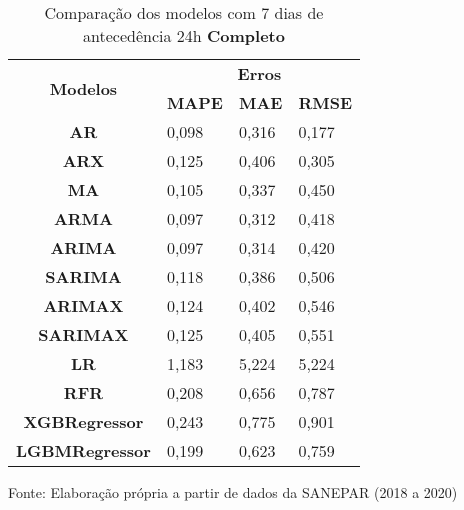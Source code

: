 \begin{table}[H]
	\centering
	\caption{Comparação dos modelos com 7 dias de antecedência 24h \textbf{Completo} }\label{tb:10-24cm}
	\begin{tabular}{@{}clll@{}}
		\toprule
		\multirow{2}{*}{\textbf{Modelos}} & \multicolumn{3}{c}{\textbf{Erros}}                                                                       \\ \cmidrule(l){2-4} 
		& \multicolumn{1}{c}{\textbf{MAPE}} & \multicolumn{1}{c}{\textbf{MAE}} & \multicolumn{1}{c}{\textbf{RMSE}} \\ \hline
\textbf{AR}                       & 0,098                             & 0,316                            & 0,177                             \\
\textbf{ARX}                      & 0,125                             & 0,406                            & 0,305                             \\
\textbf{MA}                       & 0,105                             & 0,337                            & 0,450                             \\
\textbf{ARMA}                     & 0,097                             & 0,312                            & 0,418                             \\
\textbf{ARIMA}                    & 0,097                             & 0,314                            & 0,420                             \\
\textbf{SARIMA}                   & 0,118                             & 0,386                            & 0,506                             \\
\textbf{ARIMAX}                   & 0,124                             & 0,402                            & 0,546                             \\
\textbf{SARIMAX}                  & 0,125                             & 0,405                            & 0,551                             \\
\textbf{LR}                       & 1,183                             & 5,224                            & 5,224                             \\
\textbf{RFR}                      & 0,208                             & 0,656                            & 0,787                             \\
\textbf{XGBRegressor}             & 0,243                             & 0,775                            & 0,901                             \\
\textbf{LGBMRegressor}            & 0,199                             & 0,623                            & 0,759                             \\ \bottomrule
	\end{tabular}

Fonte: Elaboração própria a partir de dados da SANEPAR (2018 a 2020)
\end{table}


